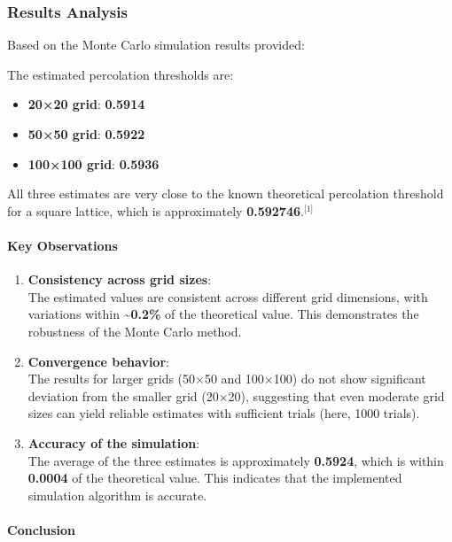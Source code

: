 \documentclass[11pt]{article}
\begin{document}
\subsubsection{Results Analysis}\label{results-analysis}

Based on the Monte Carlo simulation results provided:

The estimated percolation thresholds are:

\begin{itemize}
\item
  \textbf{20×20 grid}: \textbf{0.5914}
\item
  \textbf{50×50 grid}: \textbf{0.5922}
\item
  \textbf{100×100 grid}: \textbf{0.5936}
\end{itemize}

All three estimates are very close to the known theoretical percolation
threshold for a square lattice, which is approximately
\textbf{0.592746}.\(^\text{[1]}\)

\paragraph{Key Observations}\label{key-observations}

\begin{enumerate}
\def\labelenumi{\arabic{enumi}.}
\item
  \textbf{Consistency across grid sizes}:\\
  The estimated values are consistent across different grid dimensions,
  with variations within \textbf{\textasciitilde0.2\%} of the
  theoretical value. This demonstrates the robustness of the Monte Carlo
  method.
\item
  \textbf{Convergence behavior}:\\
  The results for larger grids (50×50 and 100×100) do not show
  significant deviation from the smaller grid (20×20), suggesting that
  even moderate grid sizes can yield reliable estimates with sufficient
  trials (here, 1000 trials).
\item
  \textbf{Accuracy of the simulation}:\\
  The average of the three estimates is approximately \textbf{0.5924},
  which is within \textbf{0.0004} of the theoretical value. This
  indicates that the implemented simulation algorithm is accurate.
\end{enumerate}

\paragraph{Conclusion}\label{conclusion}
\end{document}
